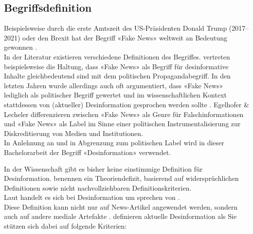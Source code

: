\documentclass[12pt,a4paper]{article}        %
\begin{document}
\subsection{Begriffsdefinition}

Beispielsweise durch die erste Amtszeit des US-Präsidenten Donald Trump (2017–2021) oder den Brexit hat der Begriff «Fake News» weltweit an Bedeutung gewonnen \parencites[1f]{hohlfeld_schlechte_2020}[1]{marx_fake_2020}. \\
In der Literatur existieren verschiedene Definitionen des Begriffes. \textcite[246f]{hohlfeld_schlechte_2020} vertreten beispielsweise die Haltung, dass «Fake News» als Begriff für desinformative Inhalte gleichbedeutend sind mit dem politischen Propagandabegriff. In den letzten Jahren wurde allerdings auch oft argumentiert, dass «Fake News» lediglich als politischer Begriff gewertet und im wissenschaftlichen Kontext stattdessen von (aktueller) Desinformation gesprochen werden sollte \parencites[3]{bontridder_role_2021}{habgood-coote_stop_2019}[148]{marx_fake_2020}. Egelhofer \& Lecheler \parencite[zit.\ nach][148]{marx_fake_2020} differenzieren zwischen «Fake News» als Genre für Falschinformationen und «Fake News» als Label im Sinne einer politischen Instrumentalisierung zur Diskreditierung von Medien und Institutionen.\\
In Anlehnung an \textcite{marx_fake_2020} und in Abgrenzung zum politischen Label wird in dieser Bachelorarbeit der Begriff «Desinformation» verwendet.

In der Wissenschaft gibt es bisher keine einstimmige Definition für Desinformation. 
\textcite[148f]{marx_fake_2020} benennen ein Theoriendefizit, basierend auf widersprüchlichen Definitionen sowie nicht nachvollziehbaren Definitionskriterien.\\
Laut \textcite[1094]{lazer_science_2018} handelt es sich bei Desinformation um 
\textcite[213]{allcott_social_2017} sprechen von  \parencites[vgl.\ auch][140]{tandoc_jr_defining_2018}[1094]{lazer_science_2018}.\\
Diese Definition kann nicht nur auf News-Artikel angewendet werden, sondern auch auf andere mediale Artefakte \parencite[3]{bontridder_role_2021} \parencite[vgl.\ auch][16]{reuter_fake_2019}. \textcite[1]{marx_fake_2020} definieren aktuelle Desinformation als  Sie stützen sich dabei auf folgende Kriterien:
\end{document}
